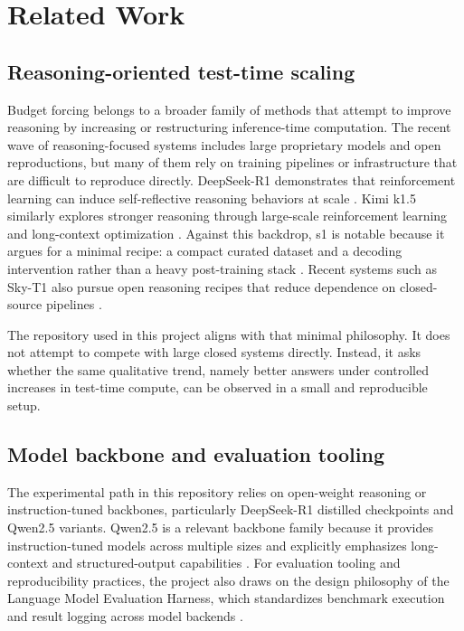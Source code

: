 \section{Related Work}\label{sec:related}

\subsection{Reasoning-oriented test-time scaling}

Budget forcing belongs to a broader family of methods that attempt to improve reasoning by increasing or restructuring inference-time computation. The recent wave of reasoning-focused systems includes large proprietary models and open reproductions, but many of them rely on training pipelines or infrastructure that are difficult to reproduce directly. DeepSeek-R1 demonstrates that reinforcement learning can induce self-reflective reasoning behaviors at scale \citep{deepseek2025r1}. Kimi k1.5 similarly explores stronger reasoning through large-scale reinforcement learning and long-context optimization \citep{kimi2025k15}. Against this backdrop, s1 is notable because it argues for a minimal recipe: a compact curated dataset and a decoding intervention rather than a heavy post-training stack \citep{muennighoff2025s1}. Recent systems such as Sky-T1 also pursue open reasoning recipes that reduce dependence on closed-source pipelines \citep{zhang2025skyt1}.

The repository used in this project aligns with that minimal philosophy. It does not attempt to compete with large closed systems directly. Instead, it asks whether the same qualitative trend, namely better answers under controlled increases in test-time compute, can be observed in a small and reproducible setup.

\subsection{Model backbone and evaluation tooling}

The experimental path in this repository relies on open-weight reasoning or instruction-tuned backbones, particularly DeepSeek-R1 distilled checkpoints and Qwen2.5 variants. Qwen2.5 is a relevant backbone family because it provides instruction-tuned models across multiple sizes and explicitly emphasizes long-context and structured-output capabilities \citep{qwenteam2024qwen25}. For evaluation tooling and reproducibility practices, the project also draws on the design philosophy of the Language Model Evaluation Harness, which standardizes benchmark execution and result logging across model backends \citep{gao2024lmharness}.

